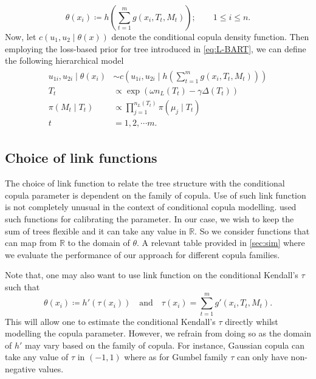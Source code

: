 \documentclass{amsart}
\begin{document}
\begin{equation*}
	\theta(x_i) \coloneqq h\left(\sum_{t=1}^m g(x_i, T_t, M_t)\right);\qquad 1\le i\le n.
\end{equation*}
Now, let $c\left(u_1,u_2\mid \theta(x)\right)$ denote the conditional copula density function. Then employing the loss-based prior for tree introduced in \cref{eq:L-BART}, we can define the following hierarchical model 
\begin{align}\label{eq:bayes:hier}
	\begin{split}
		u_{1i},u_{2i} \mid \theta(x_i) & \sim c\left(u_{1i},u_{2i}\mid h\left(\sum_{t=1}^m g(x_i, T_t, M_t)\right)\right)\\
		T_t &\propto \exp\left(\omega n_L(T_t)-\gamma\Delta(T_t)\right)\\
		\pi(M_t\mid T_t) &\propto \prod_{j=1}^{n_L(T_t)}\pi(\mu_j\mid T_t)\\
		t & = 1,2,\cdots m.
	\end{split}
\end{align}

\subsection{Choice of link functions} The choice of link function to relate the tree structure with the conditional copula parameter is dependent on the family of copula. Use of such link function is not completely unusual in the context of conditional copula modelling. \citet{ABEGAZ201243,valle_cond_cop} used such functions for calibrating the parameter. In our case, we wish to keep the sum of trees flexible and it can take any value in $\mathbb{R}$. So we consider functions that can map from $\mathbb{R}$ to the domain of $\theta$. A relevant table provided in \cref{sec:sim} where we evaluate the performance of our approach for different copula families. 

Note that, one may also want to use link function on the conditional Kendall's $\tau$ such that
\begin{equation*}
	\theta(x_i) \coloneqq h'(\tau(x_i))\quad\text{and}\quad \tau(x_i) = \sum_{t=1}^m g'(x_i, T_t, M_t).
\end{equation*}
This will allow one to estimate the conditional Kendall's $\tau$ directly whilst modelling the copula parameter. However, we refrain from doing so as the domain of $h'$ may vary based on the family of copula. For instance, Gaussian copula can take any value of $\tau$ in $(-1,1)$ where as for Gumbel family $\tau$ can only have non-negative values.
\end{document}
